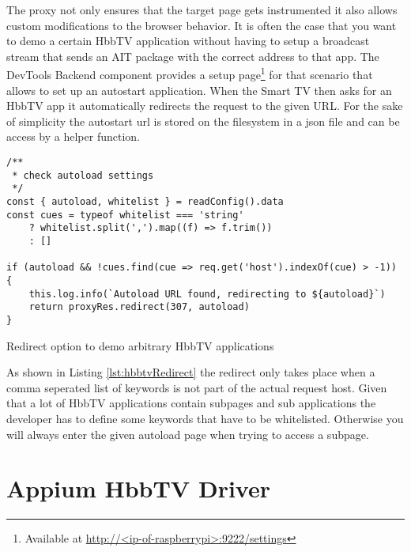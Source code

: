 The proxy not only ensures that the target page gets instrumented it also allows custom modifications to the browser behavior. It is often the case that you want to demo a certain HbbTV application without having to setup a broadcast stream that sends an AIT package with the correct address to that app. The DevTools Backend component provides a setup page\footnote{Available at \url{http://<ip-of-raspberrypi>:9222/settings}} for that scenario that allows to set up an autostart application. When the Smart TV then asks for an HbbTV app it automatically redirects the request to the given URL. For the sake of simplicity the autostart url is stored on the filesystem in a json file and can be access by a helper function.

\begin{listing}[H]
\begin{verbatim}
/**
 * check autoload settings
 */
const { autoload, whitelist } = readConfig().data
const cues = typeof whitelist === 'string'
    ? whitelist.split(',').map((f) => f.trim())
    : []

if (autoload && !cues.find(cue => req.get('host').indexOf(cue) > -1)) {
    this.log.info(`Autoload URL found, redirecting to ${autoload}`)
    return proxyRes.redirect(307, autoload)
}
\end{verbatim}
\caption{Redirect option to demo arbitrary HbbTV applications}
\label{lst:hbbtvRedirect}
\end{listing}

As shown in Listing \ref{lst:hbbtvRedirect} the redirect only takes place when a comma seperated list of keywords is not part of the actual request host. Given that a lot of HbbTV applications contain subpages and sub applications the developer has to define some keywords that have to be whitelisted. Otherwise you will always enter the given autoload page when trying to access a subpage.

\section{Appium HbbTV Driver\label{sec:driver}}


